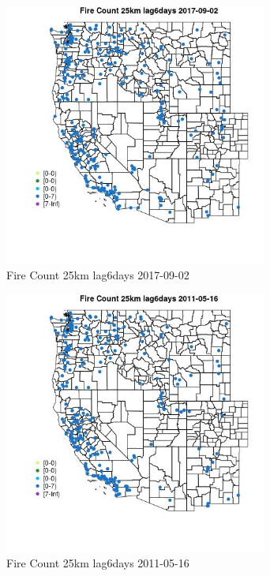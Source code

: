 \begin{figure} 
\centering  
\includegraphics[width=0.77\textwidth]{Code_Outputs/Report_ML_input_PM25_Step4_part_e_de_duplicated_aves_compiled_2019-05-21wNAs_MapObsFire_Count_25km_lag6days2017-09-02.jpg} 
\caption{\label{fig:Report_ML_input_PM25_Step4_part_e_de_duplicated_aves_compiled_2019-05-21wNAsMapObsFire_Count_25km_lag6days2017-09-02}Fire Count 25km lag6days 2017-09-02} 
\end{figure} 
 

\begin{figure} 
\centering  
\includegraphics[width=0.77\textwidth]{Code_Outputs/Report_ML_input_PM25_Step4_part_e_de_duplicated_aves_compiled_2019-05-21wNAs_MapObsFire_Count_25km_lag6days2011-05-16.jpg} 
\caption{\label{fig:Report_ML_input_PM25_Step4_part_e_de_duplicated_aves_compiled_2019-05-21wNAsMapObsFire_Count_25km_lag6days2011-05-16}Fire Count 25km lag6days 2011-05-16} 
\end{figure} 
 

